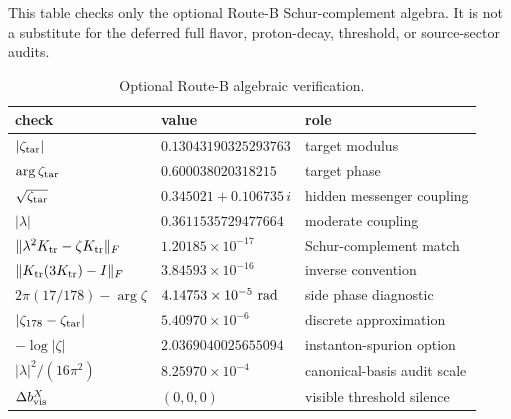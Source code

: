 \documentclass[
  aps,
  prd,
  preprint,
  nofootinbib,
  superscriptaddress,
  longbibliography
]{revtex4-2}
\begin{document}
This table checks only the optional Route-B Schur-complement algebra.  It is
not a substitute for the deferred full flavor, proton-decay, threshold, or
source-sector audits.

\begin{table}[t]
\centering
\small
\renewcommand{\arraystretch}{1.15}
\begin{tabular}{lll}
\toprule
\textbf{check} & \textbf{value} & \textbf{role}\\
\midrule
\(|\zeta_{\rm tar}|\) &
\(0.13043190325293763\) &
target modulus\\
\(\arg\zeta_{\rm tar}\) &
\(0.600038020318215\) &
target phase\\
\(\sqrt{\zeta_{\rm tar}}\) &
\(0.345021+0.106735\,i\) &
hidden messenger coupling\\
\(|\lambda|\) &
\(0.3611535729477664\) &
moderate coupling\\
\(\|\lambda^2K_{\rm tr}-\zeta K_{\rm tr}\|_F\) &
\(1.20185\times10^{-17}\) &
Schur-complement match\\
\(\|K_{\rm tr}(3K_{\rm tr})-I\|_F\) &
\(3.84593\times10^{-16}\) &
inverse convention\\
\(2\pi(17/178)-\arg\zeta\) &
\(4.14753\times10^{-5}\ {\rm rad}\) &
side phase diagnostic\\
\(|\zeta_{178}-\zeta_{\rm tar}|\) &
\(5.40970\times10^{-6}\) &
discrete approximation\\
\(-\log|\zeta|\) &
\(2.0369040025655094\) &
instanton-spurion option\\
\(|\lambda|^2/(16\pi^2)\) &
\(8.25970\times10^{-4}\) &
canonical-basis audit scale\\
\(\Delta b_{\rm vis}^{X}\) &
\((0,0,0)\) &
visible threshold silence\\
\bottomrule
\end{tabular}
\caption{Optional Route-B algebraic verification.}
\label{tab:routeb-zeta-checks}
\end{table}



\end{document}
